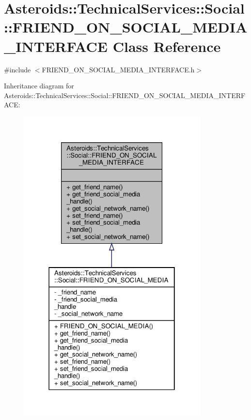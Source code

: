 \hypertarget{classAsteroids_1_1TechnicalServices_1_1Social_1_1FRIEND__ON__SOCIAL__MEDIA__INTERFACE}{}\section{Asteroids\+:\+:Technical\+Services\+:\+:Social\+:\+:F\+R\+I\+E\+N\+D\+\_\+\+O\+N\+\_\+\+S\+O\+C\+I\+A\+L\+\_\+\+M\+E\+D\+I\+A\+\_\+\+I\+N\+T\+E\+R\+F\+A\+CE Class Reference}
\label{classAsteroids_1_1TechnicalServices_1_1Social_1_1FRIEND__ON__SOCIAL__MEDIA__INTERFACE}


{\ttfamily \#include $<$F\+R\+I\+E\+N\+D\+\_\+\+O\+N\+\_\+\+S\+O\+C\+I\+A\+L\+\_\+\+M\+E\+D\+I\+A\+\_\+\+I\+N\+T\+E\+R\+F\+A\+C\+E.\+h$>$}



Inheritance diagram for Asteroids\+:\+:Technical\+Services\+:\+:Social\+:\+:F\+R\+I\+E\+N\+D\+\_\+\+O\+N\+\_\+\+S\+O\+C\+I\+A\+L\+\_\+\+M\+E\+D\+I\+A\+\_\+\+I\+N\+T\+E\+R\+F\+A\+CE\+:
\nopagebreak
\begin{figure}[H]
\begin{center}
\leavevmode
\includegraphics[width=274pt]{classAsteroids_1_1TechnicalServices_1_1Social_1_1FRIEND__ON__SOCIAL__MEDIA__INTERFACE__inherit__graph}
\end{center}
\end{figure}



